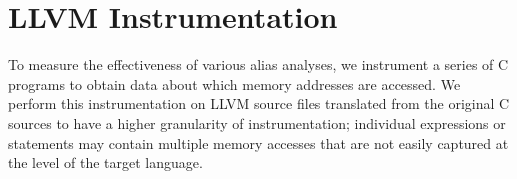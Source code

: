 \section{LLVM Instrumentation}
To measure the effectiveness of various alias analyses, we instrument a series of C programs to obtain data about which memory addresses are accessed. We perform this instrumentation on LLVM source files translated from the original C sources to have a higher granularity of instrumentation; individual expressions or statements may contain multiple memory accesses that are not easily captured at the level of the target language.
